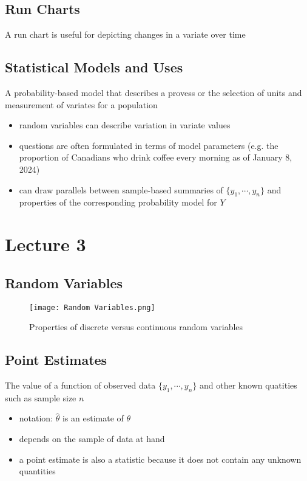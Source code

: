 \documentclass[11pt]{article}
\begin{document}
\subsection{Run Charts}
A run chart is useful for depicting changes in a variate over time
\subsection{Statistical Models and Uses}
A probability-based model that describes a provess or the selection of units and measurement of variates for a population 
\begin{itemize}
  \item random variables can describe variation in variate values 
  \item questions are often formulated in terms of model parameters (e.g. the proportion of Canadians who drink coffee every morning as of January 8, 2024)
  \item can draw parallels between sample-based summaries of $\{y_1,\cdots,y_n\}$ and properties of the corresponding probability model for $Y$
\end{itemize}

\section{Lecture 3}
\subsection{Random Variables}
\begin{figure}[tbhp]
	\begin{center}
		\texttt{[image: Random Variables.png]}
	\end{center}
	\caption{Properties of discrete versus continuous random variables}
	\label{figcaption}
\end{figure}
\newpage 
\subsection{Point Estimates}
The value of a function of observed data $\{y_1,\cdots,y_n\}$ and other known quatities such as sample size $n$
\begin{itemize}
  \item notation: $\hat{\theta}$ is an estimate of $\theta$
  \item depends on the sample of data at hand 
  \item a point estimate is also a statistic because it does not contain any unknown quantities 
\end{itemize}
\end{document}
